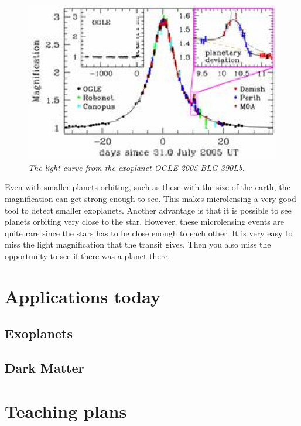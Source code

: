 \documentclass[12pt,a4paper,oneside]{scrartcl}
\begin{document}
\begin{figure}[h]
\centering
\includegraphics[width=0.5 \textwidth]{LightCurve_OGLE2005BLG390Lb}
\caption{\emph{The light curve from the exoplanet OGLE-2005-BLG-390Lb.}\label{fig:LightCurve}}
\end{figure}

Even with smaller planets orbiting, such as these with the size of the earth, the magnification can get strong enough to see. This makes microlensing a very good tool to detect smaller exoplanets. Another advantage is that it is possible to see planets orbiting very close to the star. However, these microlensing events are quite rare since the stars has to be close enough to each other. It is very easy to miss the light magnification that the transit gives. Then you also miss the opportunity to see if there was a planet there.  

\section{Applications today}
\subsection{Exoplanets}
\subsection{Dark Matter}


\section{Teaching plans}


\end{document}
